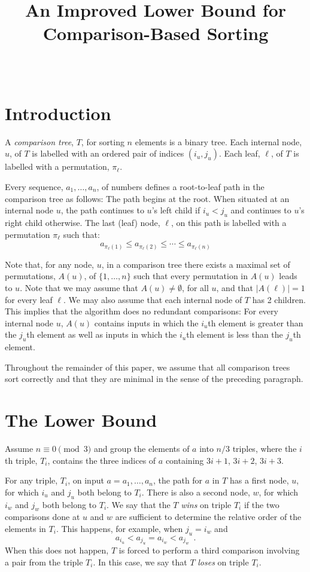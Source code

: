\documentclass{patmorin}
\title{An Improved Lower Bound for Comparison-Based Sorting}
\author{\ }
\begin{document}
\maketitle

\section{Introduction}

A \emph{comparison tree}, $T$, for sorting $n$ elements is a binary tree.
Each internal node, $u$, of $T$ is labelled with an ordered pair of
indices $(i_u,j_u)$.  Each leaf, $\ell$, of $T$ is labelled with a
permutation, $\pi_\ell$.

Every sequence, $a_1,\ldots,a_n$, of numbers defines a root-to-leaf path in the comparison tree as follows:  The path begins at the root.  When situated at an internal node $u$, the path continues to $u$'s left child if $i_u < j_u$ and continues to $u$'s right child otherwise.   The last (leaf) node, $\ell$, on this path is labelled with a permutation $\pi_\ell$ such that:
\[
    a_{\pi_\ell(1)} \le a_{\pi_\ell(2)} \le \cdots \le a_{\pi_\ell(n)}
\]

Note that, for any node, $u$, in a comparison tree there exists a
maximal set of permutations, $A(u)$, of $\{1,\ldots,n\}$ such that
every permutation in $A(u)$ leads to $u$.  Note that we may assume that
$A(u)\neq\emptyset$, for all $u$, and that $|A(\ell)|=1$ for every leaf
$\ell$.  We may also assume that each internal node of $T$ has 2 children.
This implies that the algorithm does no redundant comparisons: For every
internal node $u$, $A(u)$ contains inputs in which the $i_u$th
element is greater than the $j_u$th element as well as inputs in
which the $i_u$th element is less than the $j_u$th element.

Throughout the remainder of this paper, we assume that all comparison
trees sort correctly and that they are minimal in the sense of the
preceding paragraph.


\section{The Lower Bound}

Assume $n\equiv 0\pmod{3}$ and group the elements of $a$ into $n/3$
triples, where the $i$th triple, $T_i$, contains the three indices of $a$
containing $3i+1$, $3i+2$, $3i+3$.

For any triple, $T_i$, on input $a=a_1,\ldots,a_n$, the path for $a$
in $T$ has a first node, $u$, for which $i_u$ and $j_u$ both belong
to $T_i$.  There is also a second node, $w$, for which $i_w$ and $j_w$
both belong to $T_i$.  We say that the $T$ \emph{wins} on triple $T_i$
if the two comparisons done at $u$ and $w$ are sufficient to determine
the relative order of the elements in $T_i$.  This happens, for example,
when $j_u=i_w$ and
\[
     a_{i_u} < a_{j_u} = a_{i_w} < a_{j_w} \enspace .
\]
When this does not happen, $T$ is forced to perform a third comparison
involving a pair from the triple $T_i$.  In this case, we say that $T$
\emph{loses} on triple $T_i$.
\end{document}
